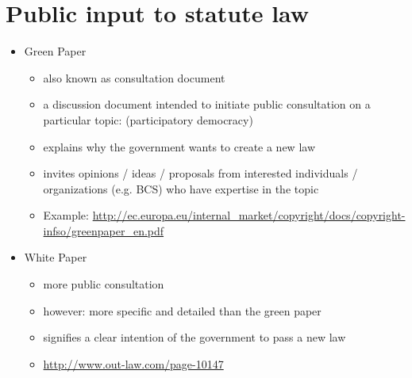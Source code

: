 \documentclass{article}
\begin{document}
\section{Public input to statute law}
\begin{itemize}
\item Green Paper 
\begin{itemize}
\item also known as consultation document
\item a discussion document intended to initiate public consultation on a particular topic: (participatory democracy)
\item explains why the government wants to create a new law
\item invites opinions / ideas / proposals from interested individuals / organizations (e.g. BCS) who have expertise in the topic
\item Example: \url{http://ec.europa.eu/internal_market/copyright/docs/copyright-infso/greenpaper_en.pdf}
\end{itemize}

\item White Paper
\begin{itemize}
\item more public consultation
\item however: more specific and detailed than the green paper
\item signifies a clear intention of the government to pass a new law
\item \url{http://www.out-law.com/page-10147}
\end{itemize}
\end{itemize}
\end{document}
